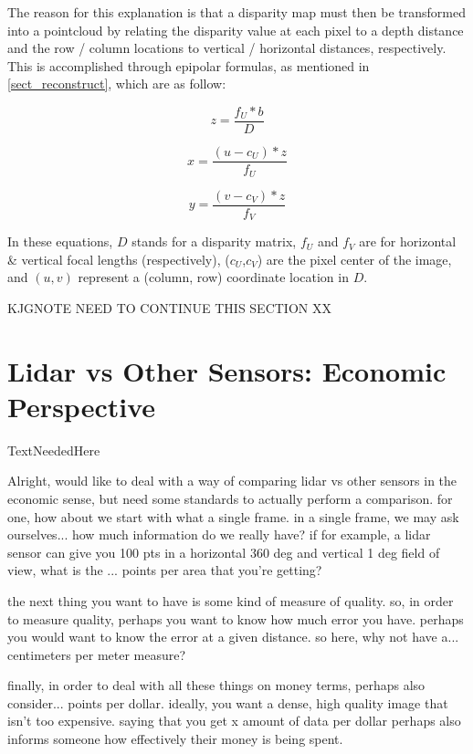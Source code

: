 The reason for this explanation is that a disparity map must then be transformed into a pointcloud by relating the disparity value at each pixel to a depth distance and the row / column locations to vertical / horizontal distances, respectively. This is accomplished through epipolar formulas, as mentioned in \ref{sect_reconstruct}, which are as follow: 

\begin{equation}
z = \frac{f_U * b}{D}
\end{equation}

\begin{equation}
x = \frac{(u - c_U) * z}{f_U}
\end{equation}

\begin{equation}
y = \frac{(v - c_V) * z}{f_V}
\end{equation}

In these equations, $D$ stands for a disparity matrix, $f_U$ and $f_V$ are for horizontal \& vertical focal lengths (respectively), ($c_U$,$c_V$) are the pixel center of the image, and $(u,v)$ represent a (column, row) coordinate location in $D$.

KJGNOTE NEED TO CONTINUE THIS SECTION XX



\newpage
\section{Lidar vs Other Sensors: Economic Perspective}
\label{appendix_lidar}
TextNeededHere


Alright, would like to deal with a way of comparing lidar vs other sensors in the economic sense, but need some standards to actually perform a comparison. for one, how about we start with what a single frame. in a single frame, we may ask ourselves... how much information do we really have? if for example, a lidar sensor can give you 100 pts in a horizontal 360 deg and vertical 1 deg field of view, what is the ... points per area that you're getting? 


the next thing you want to have is some kind of measure of quality. so, in order to measure quality, perhaps you want to know how much error you have. perhaps you would want to know the error at a given distance. so here, why not have a... centimeters per meter measure? 

finally, in order to deal with all these things on money terms, perhaps also consider... points per dollar. ideally, you want a dense, high quality image that isn't too expensive. saying that you get x amount of data per dollar perhaps also informs someone how effectively their money is being spent. 

